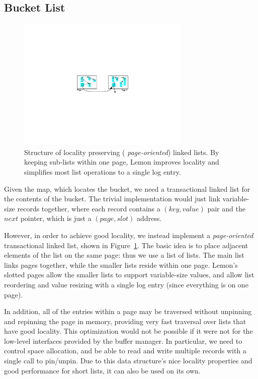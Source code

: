 \documentclass[10pt,letterpaper,twocolumn,english]{article}
\newcommand{\yad}{Lemon\xspace}
\begin{document}
\subsection{Bucket List}

\begin{figure}
\hspace{.25in}
\includegraphics[width=3.25in]{LHT2.pdf}
\caption{\sf\label{fig:LHT}Structure of locality preserving ({\em
page-oriented}) linked lists. By keeping sub-lists within one page,
\yad improves locality and simplifies most list operations to a single
log entry.}
\end{figure}

Given the map, which locates the bucket, we need a transactional
linked list for the contents of the bucket.  The trivial implementation
would just link variable-size records together, where each record
contains a $(key,value)$ pair and the $next$ pointer, which is just a
$(page,slot)$ address.

However, in order to achieve good locality, we instead implement a
{\em page-oriented} transactional linked list, shown in
Figure~\ref{fig:LHT}.  The basic idea is to place adjacent elements of
the list on the same page: thus we use a list of lists. The main list
links pages together, while the smaller lists reside within one
page. \yad's slotted pages allow the smaller lists to support
variable-size values, and allow list reordering and value resizing
with a single log entry (since everything is on one page).

In addition, all of the entries within a page may be traversed without
unpinning and repinning the page in memory, providing very fast
traversal over lists that have good locality.  This optimization would
not be possible if it were not for the low-level interfaces provided
by the buffer manager.  In particular, we need to control space
allocation, and be able to read and write multiple records with a
single call to pin/unpin.  Due to this data structure's nice locality
properties and good performance for short lists, it can also be used
on its own.
\end{document}
